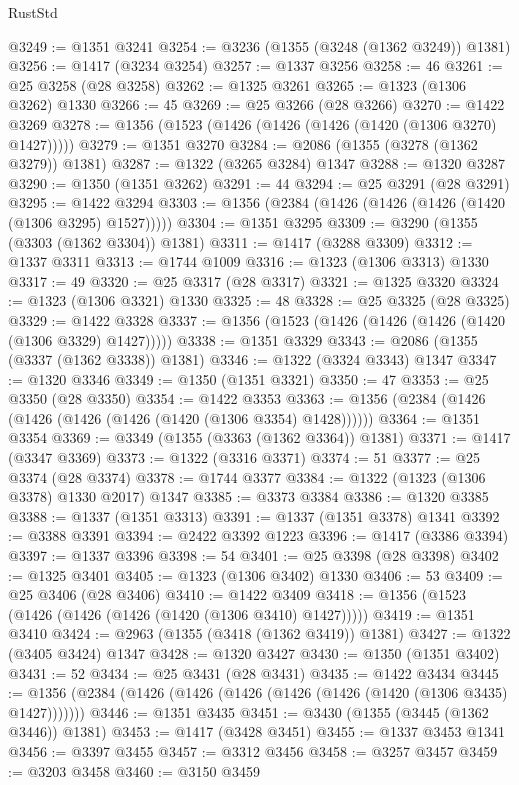 \begin{lexlean}{RustStd}
\begin{coremodule}
@3249 := @1351 @3241
@3254 := @3236 (@1355 (@3248 (@1362 @3249)) @1381)
@3256 := @1417 (@3234 @3254)
@3257 := @1337 @3256
@3258 := 46
@3261 := @25 @3258 (@28 @3258)
@3262 := @1325 @3261
@3265 := @1323 (@1306 @3262) @1330
@3266 := 45
@3269 := @25 @3266 (@28 @3266)
@3270 := @1422 @3269
@3278 := @1356 (@1523 (@1426 (@1426 (@1426 (@1420 (@1306 @3270) @1427)))))
@3279 := @1351 @3270
@3284 := @2086 (@1355 (@3278 (@1362 @3279)) @1381)
@3287 := @1322 (@3265 @3284) @1347
@3288 := @1320 @3287
@3290 := @1350 (@1351 @3262)
@3291 := 44
@3294 := @25 @3291 (@28 @3291)
@3295 := @1422 @3294
@3303 := @1356 (@2384 (@1426 (@1426 (@1426 (@1420 (@1306 @3295) @1527)))))
@3304 := @1351 @3295
@3309 := @3290 (@1355 (@3303 (@1362 @3304)) @1381)
@3311 := @1417 (@3288 @3309)
@3312 := @1337 @3311
@3313 := @1744 @1009
@3316 := @1323 (@1306 @3313) @1330
@3317 := 49
@3320 := @25 @3317 (@28 @3317)
@3321 := @1325 @3320
@3324 := @1323 (@1306 @3321) @1330
@3325 := 48
@3328 := @25 @3325 (@28 @3325)
@3329 := @1422 @3328
@3337 := @1356 (@1523 (@1426 (@1426 (@1426 (@1420 (@1306 @3329) @1427)))))
@3338 := @1351 @3329
@3343 := @2086 (@1355 (@3337 (@1362 @3338)) @1381)
@3346 := @1322 (@3324 @3343) @1347
@3347 := @1320 @3346
@3349 := @1350 (@1351 @3321)
@3350 := 47
@3353 := @25 @3350 (@28 @3350)
@3354 := @1422 @3353
@3363 := @1356 (@2384 (@1426 (@1426 (@1426 (@1426 (@1420 (@1306 @3354) @1428))))))
@3364 := @1351 @3354
@3369 := @3349 (@1355 (@3363 (@1362 @3364)) @1381)
@3371 := @1417 (@3347 @3369)
@3373 := @1322 (@3316 @3371)
@3374 := 51
@3377 := @25 @3374 (@28 @3374)
@3378 := @1744 @3377
@3384 := @1322 (@1323 (@1306 @3378) @1330 @2017) @1347
@3385 := @3373 @3384
@3386 := @1320 @3385
@3388 := @1337 (@1351 @3313)
@3391 := @1337 (@1351 @3378) @1341
@3392 := @3388 @3391
@3394 := @2422 @3392 @1223
@3396 := @1417 (@3386 @3394)
@3397 := @1337 @3396
@3398 := 54
@3401 := @25 @3398 (@28 @3398)
@3402 := @1325 @3401
@3405 := @1323 (@1306 @3402) @1330
@3406 := 53
@3409 := @25 @3406 (@28 @3406)
@3410 := @1422 @3409
@3418 := @1356 (@1523 (@1426 (@1426 (@1426 (@1420 (@1306 @3410) @1427)))))
@3419 := @1351 @3410
@3424 := @2963 (@1355 (@3418 (@1362 @3419)) @1381)
@3427 := @1322 (@3405 @3424) @1347
@3428 := @1320 @3427
@3430 := @1350 (@1351 @3402)
@3431 := 52
@3434 := @25 @3431 (@28 @3431)
@3435 := @1422 @3434
@3445 := @1356 (@2384 (@1426 (@1426 (@1426 (@1426 (@1426 (@1420 (@1306 @3435) @1427)))))))
@3446 := @1351 @3435
@3451 := @3430 (@1355 (@3445 (@1362 @3446)) @1381)
@3453 := @1417 (@3428 @3451)
@3455 := @1337 @3453 @1341
@3456 := @3397 @3455
@3457 := @3312 @3456
@3458 := @3257 @3457
@3459 := @3203 @3458
@3460 := @3150 @3459

\end{coremodule}
\end{lexlean}
